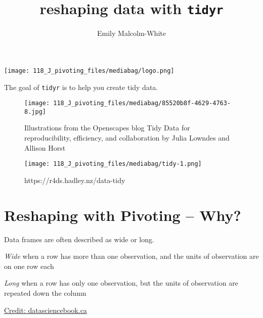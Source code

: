 \documentclass[
  letterpaper,
  DIV=11,
  numbers=noendperiod]{scrartcl}
\title{reshaping data with \texttt{tidyr}}
\author{Emily Malcolm-White}
\date{}
\begin{document}
\maketitle
\ifdefined\Shaded\renewenvironment{Shaded}{\begin{tcolorbox}[sharp corners, frame hidden, breakable, enhanced, borderline west={3pt}{0pt}{shadecolor}, interior hidden, boxrule=0pt]}{\end{tcolorbox}}\fi

\texttt{[image: 118\_J\_pivoting\_files/mediabag/logo.png]}

The goal of \texttt{tidyr} is to help you create tidy data.

\begin{figure}

{\centering \texttt{[image: 118\_J\_pivoting\_files/mediabag/85520b8f-4629-4763-8.jpg]}

}

\caption{Illustrations from the Openscapes blog Tidy Data for
reproducibility, efficiency, and collaboration by Julia Lowndes and
Allison Horst}

\end{figure}

\begin{figure}

{\centering \texttt{[image: 118\_J\_pivoting\_files/mediabag/tidy-1.png]}

}

\caption{https://r4ds.hadley.nz/data-tidy}

\end{figure}

\hypertarget{reshaping-with-pivoting-why}{%
\section{Reshaping with Pivoting --
Why?}\label{reshaping-with-pivoting-why}}

Data frames are often described as wide or long.

\emph{Wide} when a row has more than one observation, and the units of
observation are on one row each

\emph{Long} when a row has only one observation, but the units of
observation are repeated down the column

\href{https://github.com/UBC-DSCI/introduction-to-datascience/blob/main/img/wrangling/pivot_functions.001.jpeg?raw=true}{Credit:
datasciencebook.ca}
\end{document}
